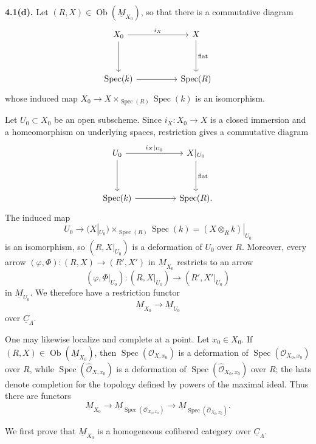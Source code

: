 \medskip
\noindent\textbf{4.1(d).}
Let $(R,X)\in\operatorname{Ob}(\underline M_{X_0})$, so that there is
a commutative diagram
\[
\begin{tikzcd}[column sep=huge,row sep=huge]
X_0 \arrow[r,"i_X"] \arrow[d] & X \arrow[d,"\mathrm{flat}"] \\
\operatorname{Spec}(k) \arrow[r] & \operatorname{Spec}(R)
\end{tikzcd}
\]
whose induced map
$X_0\longrightarrow X\times_{\operatorname{Spec}(R)}
\operatorname{Spec}(k)$ is an isomorphism.


Let $U_0\subset X_0$ be an open subscheme. Since
$i_X:X_0\longrightarrow X$ is a closed immersion and a homeomorphism
on underlying spaces, restriction gives a commutative diagram
\[
\begin{tikzcd}[column sep=huge,row sep=huge]
U_0 \arrow[r,"i_X|_{U_0}"] \arrow[d]
& X|_{U_0} \arrow[d,"\mathrm{flat}"] \\
\operatorname{Spec}(k) \arrow[r] & \operatorname{Spec}(R).
\end{tikzcd}
\]
The induced map
\[
 U_0\longrightarrow
 (X|_{U_0})\times_{\operatorname{Spec}(R)}\operatorname{Spec}(k)
 =(X\otimes_Rk)|_{U_0}
\]
is an isomorphism, so $(R,X|_{U_0})$ is a deformation of $U_0$ over
$R$. Moreover, every arrow
$(\varphi,\Phi):(R,X)\longrightarrow(R',X')$ in
$\underline M_{X_0}$ restricts to an arrow
\[
 (\varphi,\Phi|_{U_0}):(R,X|_{U_0})
 \longrightarrow(R',X'|_{U_0})
\]
in $\underline M_{U_0}$. We therefore have a restriction functor
\[
 \underline M_{X_0}\longrightarrow\underline M_{U_0}
\]
over $\underline C_\Lambda$.

One may likewise localize and complete at a point. Let
$x_0\in X_0$. If $(R,X)\in\operatorname{Ob}(\underline M_{X_0})$,
then $\operatorname{Spec}(\mathcal O_{X,x_0})$ is a deformation of
$\operatorname{Spec}(\mathcal O_{X_0,x_0})$ over $R$, while
$\operatorname{Spec}(\widehat{\mathcal O}_{X,x_0})$ is a deformation
of $\operatorname{Spec}(\widehat{\mathcal O}_{X_0,x_0})$ over $R$;
the hats denote completion for the topology defined by powers of the
maximal ideal. Thus there are functors
\[
 \underline M_{X_0}
 \longrightarrow
 \underline M_{\operatorname{Spec}(\mathcal O_{X_0,x_0})}
 \longrightarrow
 \underline M_{\operatorname{Spec}(\widehat{\mathcal O}_{X_0,x_0})}.
\]

We first prove that $\underline M_{X_0}$ is a homogeneous cofibered
category over $\underline C_\Lambda$.
